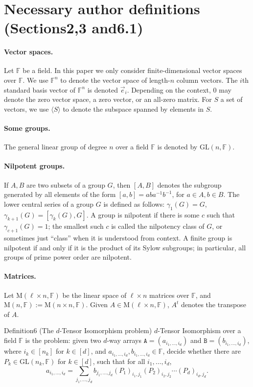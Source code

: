 \section*{Necessary author definitions (Sections2,3 and6.1)}
\paragraph{Vector spaces.} Let $\mathbb F$ be a field. In this paper we only consider finite-dimensional vector spaces over $\mathbb F$. We use $\mathbb F^n$ to denote the vector space of length-$n$ column vectors. The $i$th standard basis vector of $\mathbb F^n$ is denoted $\vec e_i$. Depending on the context, 0 may denote the zero vector space, a zero vector, or an all-zero matrix. For $S$ a set of vectors, we use $\langle S\rangle$ to denote the subspace spanned by elements in $S$.
\paragraph{Some groups.} The general linear group of degree $n$ over a field $\mathbb F$ is denoted by $\mathrm{GL}(n,\mathbb F)$.
\paragraph{Nilpotent groups.} If $A,B$ are two subsets of a group $G$, then $[A,B]$ denotes the subgroup generated by all elements of the form $[a,b]=aba^{-1}b^{-1}$, for $a\in A,b\in B$. The lower central series of a group $G$ is defined as follows: $\gamma_1(G)=G$, $\gamma_{k+1}(G)=[\gamma_k(G),G]$. A group is nilpotent if there is some $c$ such that $\gamma_{c+1}(G)=1$; the smallest such $c$ is called the nilpotency class of $G$, or sometimes just ``class'' when it is understood from context. A finite group is nilpotent if and only if it is the product of its Sylow subgroups; in particular, all groups of prime power order are nilpotent.
\paragraph{Matrices.} Let $\mathrm M(\ell\times n,\mathbb F)$ be the linear space of $\ell\times n$ matrices over $\mathbb F$, and $\mathrm M(n,\mathbb F):=\mathrm M(n\times n,\mathbb F)$. Given $A\in\mathrm M(\ell\times n,\mathbb F)$, $A^t$ denotes the transpose of $A$.
\begin{authorclaim}{Definition6 (The $d$-Tensor Isomorphism problem)}
$d$-Tensor Isomorphism over a field $\mathbb F$ is the problem: given two $d$-way arrays $\mathtt A=(a_{i_1,\ldots,i_d})$ and $\mathtt B=(b_{i_1,\ldots,i_d})$, where $i_k\in[n_k]$ for $k\in[d]$, and $a_{i_1,\ldots,i_d},b_{i_1,\ldots,i_d}\in\mathbb F$, decide whether there are $P_k\in\mathrm{GL}(n_k,\mathbb F)$ for $k\in[d]$, such that for all $i_1,\ldots,i_d$,
\[a_{i_1,\ldots,i_d}=\sum_{j_1,\ldots,j_d}b_{j_1,\ldots,j_d}(P_1)_{i_1,j_1}(P_2)_{i_2,j_2}\cdots(P_d)_{i_d,j_d}.\]
\end{authorclaim}
